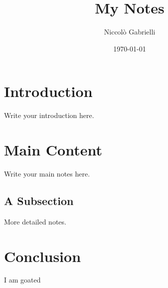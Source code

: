 \documentclass[a4paper,12pt]{article}
\title{My Notes}
\author{Niccolò Gabrielli}
\date{\today}
\begin{document}
\maketitle

\section{Introduction}
Write your introduction here.

\section{Main Content}
Write your main notes here.

\subsection{A Subsection}
More detailed notes.

\section{Conclusion}
I am goated
\end{document}
